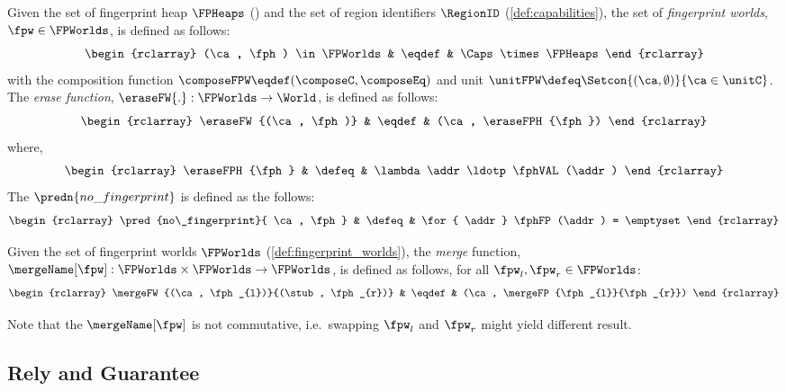 \begin{definition}
\label{def:fingerprint_worlds}
Given the set of fingerprint heap $\FPHeaps$ () and the set of region identifiers $\RegionID$ (\ref{def:capabilities}), the set of \emph{fingerprint worlds}, $\fpw \in \FPWorlds$, is defined as follows:
\[
\begin{rclarray}
	(\ca, \fph) \in \FPWorlds  & \eqdef & \Caps \times \FPHeaps
\end{rclarray}
\]
with the composition function \( \composeFPW \eqdef (\composeC, \composeEq) \) and unit \( \unitFPW  \defeq \Setcon{(\ca, \emptyset)}{\ca \in \unitC }\).
The \emph{erase function}, $\eraseFW{.}: \FPWorlds \rightarrow \World$, is defined as follows:
\[
\begin{rclarray}
	\eraseFW{(\ca, \fph)} & \eqdef & (\ca, \eraseFPH{\fph})
\end{rclarray}
\]
where,
\[
\begin{rclarray}
	\eraseFPH{\fph} & \defeq & \lambda \addr \ldotp \fphVAL(\addr)
\end{rclarray}
\]
The \( \predn{no\_fingerprint} \) is defined as the follows:
\[
\begin{rclarray}
    \pred{no\_fingerprint}{ \ca, \fph } & \defeq & \for{ \addr } \fphFP(\addr) = \emptyset
\end{rclarray}
\]
\end{definition}

\begin{definition}
Given the set of fingerprint worlds $\FPWorlds$ (\ref{def:fingerprint_worlds}), the \emph{merge} function, $\mergeName[\fpw]: \FPWorlds \times \FPWorlds \rightarrow \FPWorlds$, is defined as follows, for all $\fpw_{l},\fpw_{r} \in \FPWorlds$:
\[
    \begin{rclarray}
	\mergeFW{(\ca, \fph_{l})}{(\stub, \fph_{r})} & \eqdef & (\ca, \mergeFP{\fph_{l}}{\fph_{r}}) 
    \end{rclarray}
\]
\end{definition}

Note that the \( \mergeName[\fpw] \) is not commutative, i.e.\ swapping \( \fpw_{l}\) and \( \fpw_{r}\) might yield different result.

\subsection{Rely and Guarantee}


